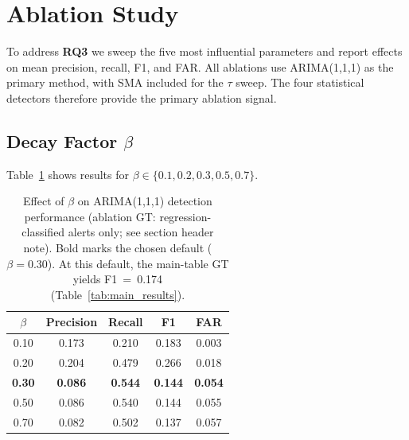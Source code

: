 \documentclass[pdflatex,sn-nature]{sn-jnl}
\theoremstyle{thmstyleone}%
\begin{document}
\section{Ablation Study}\label{sec:ablation}

\noindent{}

\medskip
To address \textbf{RQ3} we sweep the five most influential parameters and
report effects on mean precision, recall, F1, and FAR.
All ablations use ARIMA(1,1,1) as the primary method, with SMA included
for the $\tau$ sweep.
The four statistical detectors therefore provide the primary ablation signal.

\subsection{Decay Factor \texorpdfstring{$\beta$}{beta}}\label{sec:ablation:beta}

Table~\ref{tab:ablation_beta} shows results for $\beta \in \{0.1, 0.2, 0.3,
0.5, 0.7\}$.

\begin{table}[tbp]
\centering
\begin{tabular}{ccccc}
\toprule
$\beta$ & Precision & Recall & F1 & FAR \\
\midrule
0.10 & 0.173 & 0.210 & 0.183 & 0.003 \\
0.20 & 0.204 & 0.479 & 0.266 & 0.018 \\
\textbf{0.30} & \textbf{0.086} & \textbf{0.544} & \textbf{0.144} & \textbf{0.054} \\
0.50 & 0.086 & 0.540 & 0.144 & 0.055 \\
0.70 & 0.082 & 0.502 & 0.137 & 0.057 \\
\bottomrule
\end{tabular}
\caption{Effect of $\beta$ on ARIMA(1,1,1) detection performance
  (ablation GT: regression-classified alerts only; see section header note).
  Bold marks the chosen default ($\beta = 0.30$).
  At this default, the main-table GT yields F1~=~0.174 (Table~\ref{tab:main_results}).}
\label{tab:ablation_beta}
\end{table}
\end{document}
